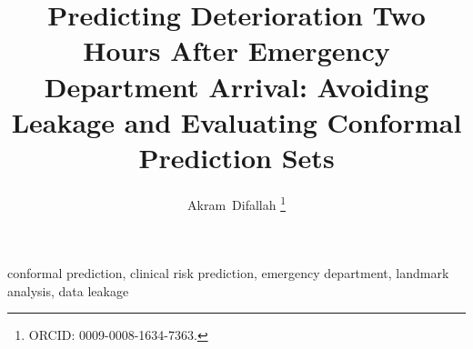 


\usepackage{xr}





\title{Predicting Deterioration Two Hours After Emergency Department Arrival: Avoiding Leakage and Evaluating Conformal Prediction Sets}
\author{Akram~Difallah%
\thanks{ORCID: 0009-0008-1634-7363. }}

\maketitle



\begin{IEEEkeywords}
conformal prediction, clinical risk prediction, emergency department, landmark analysis, data leakage
\end{IEEEkeywords}












